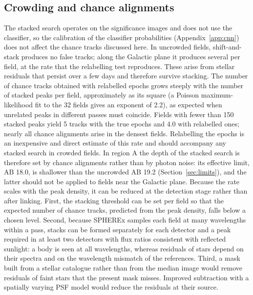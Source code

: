 \documentclass[twocolumn,linenumbers,anonymous]{aastex702}
\begin{document}
\subsection{Crowding and chance alignments}
The stacked search operates on the significance images and does not use the classifier, so the calibration of the classifier probabilities (Appendix~\ref{app:cnn}) does not affect the chance tracks discussed here. In uncrowded fields, shift-and-stack produces no false tracks; along the Galactic plane it produces several per field, at the rate that the relabelling test reproduces. These arise from stellar residuals that persist over a few days and therefore survive stacking. The number of chance tracks obtained with relabelled epochs grows steeply with the number of stacked peaks per field, approximately as its square (a Poisson maximum-likelihood fit to the 32 fields gives an exponent of 2.2), as expected when unrelated peaks in different passes must coincide. Fields with fewer than 150 stacked peaks yield 5 tracks with the true epochs and 4.0 with relabelled ones; nearly all chance alignments arise in the densest fields. Relabelling the epochs is an inexpensive and direct estimate of this rate and should accompany any stacked search in crowded fields. In region A the depth of the stacked search is therefore set by chance alignments rather than by photon noise: its effective limit, AB 18.0, is shallower than the uncrowded AB 19.2 (Section~\ref{sec:limits}), and the latter should not be applied to fields near the Galactic plane. Because the rate scales with the peak density, it can be reduced at the detection stage rather than after linking. First, the stacking threshold can be set per field so that the expected number of chance tracks, predicted from the peak density, falls below a chosen level. Second, because SPHEREx samples each field at many wavelengths within a pass, stacks can be formed separately for each detector and a peak required in at least two detectors with flux ratios consistent with reflected sunlight: a body is seen at all wavelengths, whereas residuals of stars depend on their spectra and on the wavelength mismatch of the references. Third, a mask built from a stellar catalogue rather than from the median image would remove residuals of faint stars that the present mask misses. Improved subtraction with a spatially varying PSF model would reduce the residuals at their source.
\end{document}
